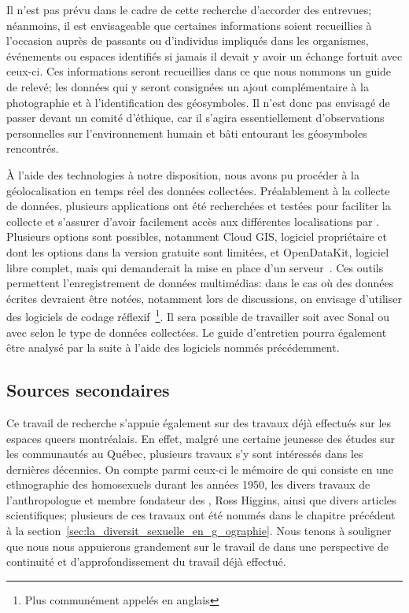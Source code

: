 Il n'est pas prévu dans le cadre de cette recherche d'accorder des entrevues; néanmoins, il est envisageable que certaines informations soient recueillies à l'occasion auprès de passants ou d'individus impliqués dans les organismes, événements ou espaces identifiés si jamais il devait y avoir un échange fortuit avec ceux-ci.
Ces informations seront recueillies dans ce que nous nommons un guide de relevé; les données qui y seront consignées un ajout complémentaire à la photographie et à l'identification des géosymboles.
Il n'est donc pas envisagé de passer devant un comité d'éthique, car il s'agira essentiellement d'observations personnelles sur l'environnement humain et bâti entourant les géosymboles rencontrés.

À l'aide des technologies à notre disposition, nous avons pu procéder à la géolocalisation en temps réel des données collectées.
Préalablement à la collecte de données, plusieurs applications ont été recherchées et testées pour faciliter la collecte et s'assurer d'avoir facilement accès aux différentes localisations par \gps.
Plusieurs options sont possibles, notamment Cloud GIS, logiciel propriétaire et dont les options dans la version gratuite sont limitées, et OpenDataKit, logiciel libre complet, mais qui demanderait la mise en place d'un serveur~\citep{OpenDataKit2014}.
Ces outils permettent l'enregistrement de données multimédias: dans le cas où des données écrites devraient être notées, notamment lors de discussions, on envisage d'utiliser des logiciels de codage réflexif~\footnote{Plus communément appelés en anglais \cadqas}.
Il sera possible de travailler soit avec Sonal ou avec \rqda{} selon le type de données collectées.
Le guide d'entretien pourra également être analysé par la suite à l'aide des logiciels nommés précédemment.

\subsection{Sources secondaires}
\label{sub:sources_secondaires}
Ce travail de recherche s'appuie également sur des travaux déjà effectués sur les espaces queers montréalais.
En effet, malgré une certaine jeunesse des études sur les communautés \lgbt{} au Québec, plusieurs travaux s'y sont intéressés dans les dernières décennies.
On compte parmi ceux-ci le mémoire de \cite{Leznoff1954} qui consiste en une ethnographie des homosexuels durant les années 1950, les divers travaux de l'anthropologue et membre fondateur des \agq{}, Ross Higgins, ainsi que divers articles scientifiques; plusieurs de ces travaux ont été nommés dans le chapitre précédent à la section~\ref{sec:la_diversit_sexuelle_en_g_ographie}.
Nous tenons à souligner que nous nous appuierons grandement sur le travail de \citep{Giraud2014} dans une perspective de continuité et d'approfondissement du travail déjà effectué.

